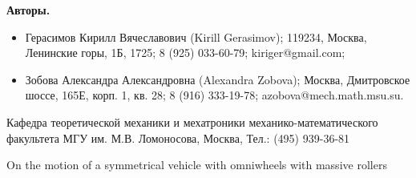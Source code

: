 \newpage
{\bf Авторы.}

\begin{itemize}
    \item Герасимов Кирилл Вячеславович (Kirill Gerasimov); 119234, Москва, Ленинские горы, 1Б, 1725; 8 (925) 033-60-79; kiriger@gmail.com;
    \item Зобова Александра Александровна (Alexandra Zobova); Москва, Дмитровское шоссе, 165Е, корп. 1, кв. 28; 8 (916) 333-19-78; azobova@mech.math.msu.su.
\end{itemize}
    
    Кафедра теоретической механики и мехатроники механико-математического факультета МГУ им. М.В. Ломоносова, Москва, Тел.: (495) 939-36-81
    
    On the motion of a symmetrical vehicle with omniwheels with massive rollers
    

